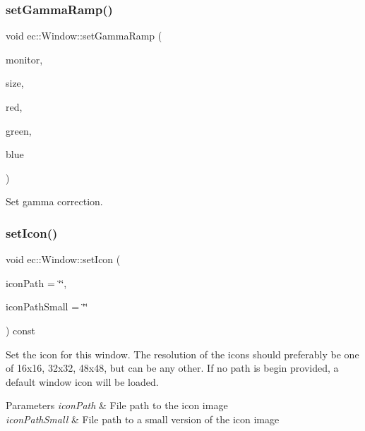\subsubsection{\texorpdfstring{set\+Gamma\+Ramp()}{setGammaRamp()}\hspace{0.1cm}{\footnotesize\ttfamily [2/2]}}
{\footnotesize\ttfamily void ec\+::\+Window\+::set\+Gamma\+Ramp (\begin{DoxyParamCaption}\item[{G\+L\+F\+Wmonitor $\ast$}]{monitor,  }\item[{int}]{size,  }\item[{unsigned short $\ast$}]{red,  }\item[{unsigned short $\ast$}]{green,  }\item[{unsigned short $\ast$}]{blue }\end{DoxyParamCaption})\hspace{0.3cm}{\ttfamily [static]}}

Set gamma correction. \mbox{\label{classec_1_1_window_a906d0c0d6b6c50bb98de694b5a09dc17}} 
\subsubsection{\texorpdfstring{set\+Icon()}{setIcon()}}
{\footnotesize\ttfamily void ec\+::\+Window\+::set\+Icon (\begin{DoxyParamCaption}\item[{const char $\ast$}]{icon\+Path = {\ttfamily \char`\"{}\char`\"{}},  }\item[{const char $\ast$}]{icon\+Path\+Small = {\ttfamily \char`\"{}\char`\"{}} }\end{DoxyParamCaption}) const}



Set the icon for this window. The resolution of the icons should preferably be one of 16x16, 32x32, 48x48, but can be any other. If no path is begin provided, a default window icon will be loaded. 


\begin{DoxyParams}{Parameters}
{\em icon\+Path} & File path to the icon image \\
\hline
{\em icon\+Path\+Small} & File path to a small version of the icon image \\
\hline
\end{DoxyParams}
\mbox{\label{classec_1_1_window_a093cfa214eafa8cfd1045d23b4e05d60}} 
